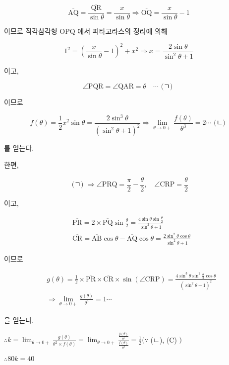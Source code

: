 \documentclass[10pt]{article}
\begin{document}
\[
\overline{\mathrm{AQ}}=\frac{\overline{\mathrm{QR}}}{\sin \theta}=\frac{x}{\sin \theta} \Rightarrow \overline{\mathrm{OQ}}=\frac{x}{\sin \theta}-1
\]

이므로 직각삼각형 OPQ 에서 피타고라스의 정리에 의해

\[
1^{2}=\left(\frac{x}{\sin \theta}-1\right)^{2}+x^{2} \Rightarrow x=\frac{2 \sin \theta}{\sin ^{2} \theta+1}
\]

이고,

\[
\angle \mathrm{PQR}=\angle \mathrm{QAR}=\theta \quad \cdots \text { (ㄱ) }
\]

이므로

\[
f(\theta)=\frac{1}{2} x^{2} \sin \theta=\frac{2 \sin ^{3} \theta}{\left(\sin ^{2} \theta+1\right)^{2}} \Rightarrow \lim _{\theta \rightarrow 0+} \frac{f(\theta)}{\theta^{3}}=2 \cdots \text { (ㄴ) }
\]

를 얻는다.

한편,

\[
\text { (ㄱ) } \Rightarrow \angle \mathrm{PRQ}=\frac{\pi}{2}-\frac{\theta}{2}, \quad \angle \mathrm{CRP}=\frac{\theta}{2}
\]

이고,

\[
\begin{aligned}
& \overline{\mathrm{PR}}=2 \times \overline{\mathrm{PQ}} \sin \frac{\theta}{2}=\frac{4 \sin \theta \sin \frac{\theta}{2}}{\sin ^{2} \theta+1} \\
& \overline{\mathrm{CR}}=\overline{\mathrm{AB}} \cos \theta-\overline{\mathrm{AQ}} \cos \theta=\frac{2 \sin ^{2} \theta \cos \theta}{\sin ^{2} \theta+1}
\end{aligned}
\]

이므로

\[
\begin{aligned}
& g(\theta)=\frac{1}{2} \times \overline{\mathrm{PR}} \times \overline{\mathrm{CR}} \times \sin (\angle \mathrm{CRP})=\frac{4 \sin ^{3} \theta \sin ^{2} \frac{\theta}{2} \cos \theta}{\left(\sin ^{2} \theta+1\right)^{2}} \\
& \Rightarrow \lim _{\theta \rightarrow 0+} \frac{g(\theta)}{\theta^{5}}=1 \cdots
\end{aligned}
\]

을 얻는다.

\(\therefore k=\lim _{\theta \rightarrow 0+} \frac{g(\theta)}{\theta^{2} \times f(\theta)}=\lim _{\theta \rightarrow 0+} \frac{\frac{g(\theta)}{\theta^{5}}}{\frac{f(\theta)}{\theta^{3}}}=\frac{1}{2}(\because\) (ㄴ), (C) \()\)

\(\therefore 80 k=40\)
\end{document}

